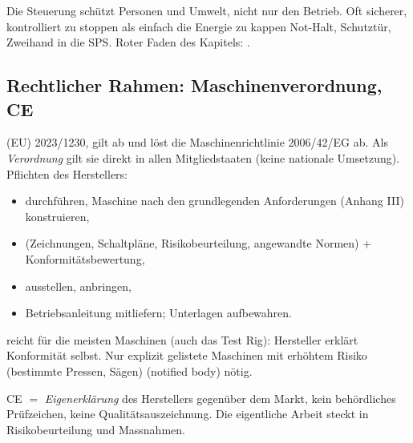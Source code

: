 \label{sec:safety}

 Die Steuerung schützt Personen und Umwelt,
nicht nur den Betrieb. Oft sicherer, kontrolliert zu stoppen als einfach
die Energie zu kappen \ra Not-Halt, Schutztür, Zweihand in die SPS.
Roter Faden des Kapitels:  \ra {} \ra
{} \ra {} \ra {}.

\subsection{Rechtlicher Rahmen: Maschinenverordnung, CE}
\label{sec:ce}
 (EU) 2023/1230, gilt ab  und
löst die Maschinenrichtlinie 2006/42/EG ab. Als \emph{Verordnung} gilt
sie direkt in allen Mitgliedstaaten (keine nationale Umsetzung).
Pflichten des Herstellers:
\begin{itemize}\setlength\itemsep{0pt}
\item {} durchführen, Maschine nach den grundlegenden
  Anforderungen (Anhang III) konstruieren,
\item {} (Zeichnungen, Schaltpläne,
  Risikobeurteilung, angewandte Normen) + Konformitätsbewertung,
\item {} ausstellen,  anbringen,
\item Betriebsanleitung mitliefern; Unterlagen 
  aufbewahren.
\end{itemize}
 reicht für die meisten Maschinen
(auch das Test Rig): Hersteller erklärt Konformität selbst. Nur
explizit gelistete Maschinen mit erhöhtem Risiko (bestimmte Pressen,
Sägen) \ra {} (notified body) nötig.
\begin{falle}
CE $=$ \emph{Eigenerklärung} des Herstellers gegenüber dem Markt, kein
behördliches Prüfzeichen, keine Qualitätsauszeichnung. Die eigentliche
Arbeit steckt in Risikobeurteilung und Massnahmen.
\end{falle}

